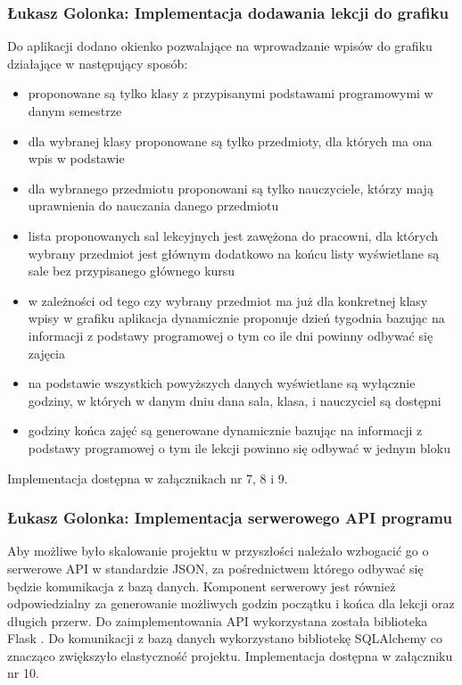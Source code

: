 \documentclass[12pt,a4paper,oneside]{article}
\theoremstyle{definition}
\numberwithin{equation}{section}
\begin{document}
\subsubsection{Łukasz Golonka: Implementacja dodawania lekcji do grafiku}
Do aplikacji dodano okienko pozwalające na wprowadzanie wpisów do grafiku działające w następujący sposób:
\begin{itemize}
\item proponowane są tylko klasy z przypisanymi podstawami programowymi w danym semestrze
\item dla wybranej klasy proponowane są tylko przedmioty, dla których ma ona wpis w podstawie
\item dla wybranego przedmiotu proponowani są tylko nauczyciele, którzy mają uprawnienia do nauczania danego przedmiotu
\item lista proponowanych sal lekcyjnych jest zawężona do pracowni, dla których wybrany przedmiot jest głównym dodatkowo na końcu listy wyświetlane są sale bez przypisanego głównego kursu
\item w zależności od tego czy wybrany przedmiot ma już dla konkretnej klasy wpisy w grafiku aplikacja dynamicznie proponuje dzień tygodnia bazując na informacji z podstawy programowej o tym co ile dni powinny odbywać się zajęcia
\item na podstawie wszystkich powyższych danych wyświetlane są wyłącznie godziny, w których w danym dniu dana sala, klasa, i nauczyciel są dostępni
\item godziny końca zajęć są generowane dynamicznie bazując na informacji z podstawy programowej o tym ile lekcji powinno się odbywać w jednym bloku
\end{itemize}
Implementacja dostępna w załącznikach nr 7, 8 i 9.

\subsubsection{Łukasz Golonka: Implementacja serwerowego API programu}
Aby możliwe było skalowanie projektu w przyszłości należało wzbogacić go o serwerowe API w standardzie JSON, za pośrednictwem którego odbywać się będzie komunikacja z bazą danych.
Komponent serwerowy jest również odpowiedzialny za generowanie możliwych godzin początku i końca dla lekcji oraz długich przerw.
Do zaimplementowania API wykorzystana została biblioteka Flask \cite{flask}.
Do komunikacji z bazą danych wykorzystano bibliotekę SQLAlchemy \cite{alchemy} co znacząco zwiększyło elastyczność projektu.
Implementacja dostępna w załączniku nr 10.
\end{document}
